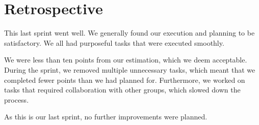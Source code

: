 \section{Retrospective}\label{sec:sprint6retrospective}
This last sprint went well. We generally found our execution and planning to be satisfactory. We all had purposeful tasks that were executed smoothly.

We were less than ten points from our estimation, which we deem acceptable. During the sprint, we removed multiple unnecessary tasks, which meant that we completed fewer points than we had planned for. Furthermore, we worked on tasks that required collaboration with other groups, which slowed down the process.

As this is our last sprint, no further improvements were planned.